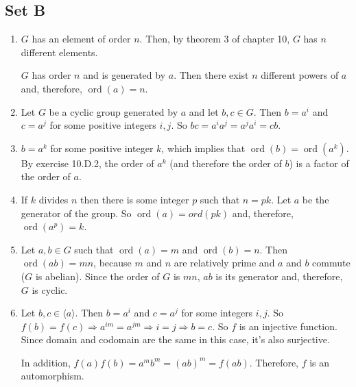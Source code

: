 \documentclass{article}
\DeclareMathOperator{\ord}{ord}
\newcommand{\angled}[1]{\langle#1\rangle}
\begin{document}
\subsection{Set B}
\begin{enumerate}
    \item $ G $ has an element of order $ n $. Then, by theorem 3 of chapter 10, $ G $ has $ n $ different elements.

    $ G $ has order $ n $ and is generated by $ a $. Then there exist $ n $ different powers of $ a $ and, therefore, $ \ord(a) = n$.

    \item Let $ G $ be a cyclic group generated by $ a $ and let $ b, c \in G $. Then $ b = a^i $ and $ c = a^j $ for some positive integers $ i, j $. So $ bc = a^ia^j = a^ja^i = cb $.

    \item $ b = a^k $ for some positive integer $ k $, which implies that $ \ord(b) = \ord(a^k) $. By exercise 10.D.2, the order of $ a^k $ (and therefore the order of $ b $) is a factor of the order of $ a $.

    \item If $ k $ divides $ n $ then there is some integer $ p $ such that $ n = pk $. Let $ a $ be the generator of the group. So $ \ord(a) = ord(pk) $ and, therefore, $ \ord(a^p) = k $.

    \item Let $ a, b \in G $ such that $ \ord(a) = m $ and $ \ord(b) = n $. Then $ \ord(ab) = mn $, because $ m $ and $ n $ are relatively prime and $ a $ and $ b $ commute ($ G $ is abelian). Since the order of $ G $ is $ mn $, $ ab $ is its generator and, therefore, $ G $ is cyclic.

    \item Let $ b, c \in \angled{a} $. Then $ b = a^i $  and $ c = a^j $ for some integers $ i, j $. So $ f(b) = f(c) \Rightarrow    a^{im} = a^{jm} \Rightarrow i = j \Rightarrow b = c$. So $ f $ is an injective function. Since domain and codomain are the same in this case, it's also surjective.

    In addition, $ f(a)f(b) = a^mb^m  = (ab)^m = f(ab) $. Therefore, $ f $ is an automorphism.
\end{enumerate}
\end{document}
